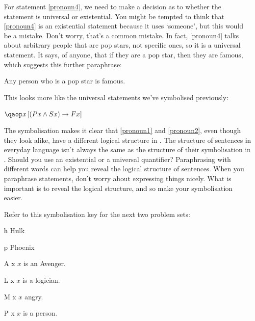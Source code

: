 \documentclass[PHIL101-Textbook.tex]{subfiles}
\begin{document}
\noindent For statement \ref{pronoun4}, we need to make a decision as to whether the statement is universal or existential. You might be tempted to think that \ref{pronoun4} is an existential statement because it uses `someone', but this would be a mistake. Don't worry, that's a common mistake. In fact, \ref{pronoun4} talks about arbitrary people that are pop stars, not specific ones, so it is a universal statement. It says, of anyone, that if they are a pop star, then they are famous, which suggests this further paraphrase: 

\begin{earg}
\item[\ex{pronoun6}]  Any person who is a pop star is famous. 
\end{earg}

\noindent This looks more like the universal statements we've symbolised previously: 

\begin{earg}
\item[\ex{pronoun7}] $\qab{x}{(\atom P x  \eand \atom S x ) \eif \atom F x }$
\end{earg}

\noindent The symbolisation makes it clear that \ref{pronoun1} and \ref{pronoun2}, even though they look alike, have a different logical structure in \pl. The structure of sentences in everyday language isn't always the same as the structure of their symbolisation in \pl. Should you use an existential or a universal quantifier? Paraphrasing with different words can help you reveal the logical structure of sentences. When you paraphrase statements, don't worry about expressing things nicely. What is important is to reveal the logical structure, and so make your symbolisation easier. 



\pagebreak
\practiceproblems

  
Refer to this symbolisation key for the next two problem sets: 

\begin{ekey}
\item[h] Hulk
\item[p] Phoenix
\item[\atom A x ] $x$ is an Avenger.
\item[\atom L x ] $x$ is a logician. 
\item[\atom M x ] $x$ angry.
  \item[\atom P x] $x$ is a person.
\end{ekey}
\end{document}
